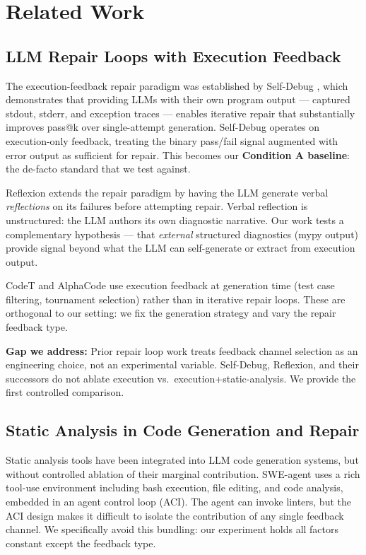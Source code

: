 \section{Related Work}

\subsection{LLM Repair Loops with Execution Feedback}

The execution-feedback repair paradigm was established by Self-Debug
\citep{Chen2023Teaching}, which demonstrates that providing LLMs with their
own program output --- captured stdout, stderr, and exception traces --- enables
iterative repair that substantially improves pass@k over single-attempt
generation. Self-Debug operates on execution-only feedback, treating the
binary pass/fail signal augmented with error output as sufficient for repair.
This becomes our \textbf{Condition A baseline}: the de-facto standard that we
test against.

Reflexion \citep{Shinn2023Reflexion} extends the repair paradigm by having the
LLM generate verbal \emph{reflections} on its failures before attempting repair.
Verbal reflection is unstructured: the LLM authors its own diagnostic narrative.
Our work tests a complementary hypothesis --- that \emph{external} structured
diagnostics (mypy output) provide signal beyond what the LLM can self-generate
or extract from execution output.

CodeT \citep{Chen2022CodeT} and AlphaCode \citep{Li2022Competition} use
execution feedback at generation time (test case filtering, tournament selection)
rather than in iterative repair loops. These are orthogonal to our setting: we
fix the generation strategy and vary the repair feedback type.

\textbf{Gap we address:} Prior repair loop work treats feedback channel selection
as an engineering choice, not an experimental variable. Self-Debug, Reflexion,
and their successors do not ablate execution vs.\ execution+static-analysis.
We provide the first controlled comparison.

\subsection{Static Analysis in Code Generation and Repair}

Static analysis tools have been integrated into LLM code generation systems,
but without controlled ablation of their marginal contribution. SWE-agent
\citep{Yang2024SWEagent} uses a rich tool-use environment including bash
execution, file editing, and code analysis, embedded in an agent control loop
(ACI). The agent can invoke linters, but the ACI design makes it difficult to
isolate the contribution of any single feedback channel. We specifically avoid
this bundling: our experiment holds all factors constant except the feedback type.

